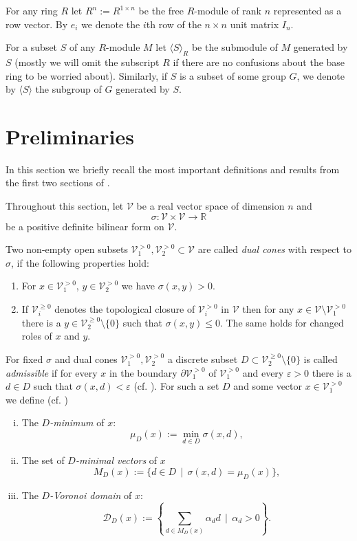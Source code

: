 \documentclass[10pt, preprint]{elsarticle}
\theoremstyle{definition}
\theoremstyle{definition}
\newcommand{\R}{\mathbb{R}}
\newcommand{\calD}{\mathcal{D}}
\newcommand{\V}{\mathcal{V}}
\newcommand{\eps}{\varepsilon}
\newcommand{\Vgt}{\V_1^{>0}}
\newcommand{\Wgt}{\V_2^{>0}}
\newcommand{\Wgeq}{\V_2^{\geq 0}}
\newcommand{\Vigt}{\V_i^{>0}}
\newcommand{\Vigeq}{\V_i^{\geq 0}}
\begin{document}
For any ring $R$ let $R^n:=R^{1\times n}$ be the free $R$-module of rank $n$ represented as a row vector. By $e_i$ we denote the $i$th row of the $n\times n$ unit matrix $I_n$.

For a subset $S$ of any $R$-module $M$ let $\langle S\rangle_R$ be the submodule of $M$ generated by $S$ (mostly we will omit the subscript $R$ if there are no confusions about the base ring to be worried about). Similarly, if $S$ is a subset of some group $G$, we denote by $\langle S\rangle$ the subgroup of $G$ generated by $S$.
\section{Preliminaries}\label{subprelim}
In this section we briefly recall the most important definitions and results from the first two sections of \cite{Opg01}.

Throughout this section, let $\V$ be a real vector space of dimension $n$ and
\[\sigma:\V\times \V\rightarrow \R\]
be a positive definite bilinear form on $\V$.

Two non-empty open subsets $\Vgt,\Wgt\subset\V$ are called \emph{dual cones} with respect to $\sigma$, if the following properties hold:
\begin{enumerate}[(DC.1)]
\item\label{DC1} For $x\in\Vgt$, $y\in\Wgt$ we have $\sigma(x,y)>0$.
\item\label{DC2} If $\Vigeq$ denotes the topological closure of $\Vigt$ in $\V$ then for any $x\in\V\setminus\Vgt$ there is a $y\in\Wgeq\setminus\{0\}$ such that $\sigma(x,y)\leq 0$. The same holds for changed roles of $x$ and $y$. 
\end{enumerate}

For fixed $\sigma$ and dual cones $\Vgt,\Wgt$ a discrete subset $D\subset\Wgeq\setminus\{0\}$ is called \emph{admissible} if for every $x$ in the boundary $\partial\Vgt$ of $\Vgt$ and every $\eps>0$ there is a $d\in D$ such that $\sigma(x,d)<\eps$ (cf. \cite[Definition 1.4, Lemma 1.5]{Opg01}). For such a set $D$ and some vector $x\in\Vgt$ we define (cf. \cite[Definition 1.2]{Opg01})
\begin{enumerate}[(i)]
\item The $D$\emph{-minimum} of $x$:
\[\mu_D(x):=\min\limits_{d\in D} \sigma(x,d),\]
\item The set of $D$\emph{-minimal vectors} of $x$
\[M_D(x):=\{d\in D\,\mid\, \sigma(x,d)=\mu_D(x)\},\]
\item The $D$\emph{-Voronoi domain} of $x$:
\[\calD_D(x):=\left\lbrace \sum\limits_{d\in M_D(x)} \alpha_dd\,\mid\, \alpha_d>0\right\}.\]
\end{enumerate}
\end{document}

